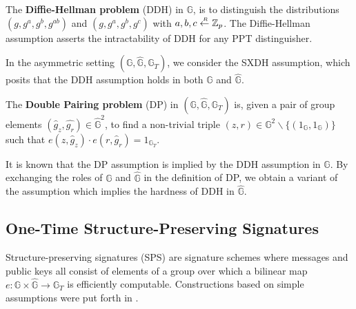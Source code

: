 \documentclass[10pt]{llncs}
\newcommand{\G}{\mathbb{G}}
\newcommand{\Z}{\mathbb{Z}}
\newcommand{\sample}{\stackrel{{\scriptscriptstyle \mkern4mu R}}{\gets}}
\begin{document}
\begin{definition} \label{DDH-def} The {\bf Diffie-Hellman problem} (DDH) in $\G$,
 is to distinguish the distributions $(g, g^a, g^b, g^{ab})$ and $(g, g^a, g^b, g^c)$ with $a, b, c \sample \Z_p$.
 The Diffie-Hellman assumption asserts the intractability of DDH for any PPT distinguisher.

 In the asymmetric setting $(\G,\hat{\G}, \G_T)$, we consider the SXDH  assumption,
 which posits that the DDH assumption holds in both $\G$ and $\hat{\G}$.
\end{definition}

\begin{definition} \label{DP-def} The {\bf Double Pairing problem} (DP) in $(\G, \hat{\G}, \G_T)$ is,
  given a pair of group elements $(\hat{g}_z, \hat{g_r}) \in \hat{\G}^2$,
  to find a non-trivial triple $(z, r) \in \G^2\backslash \{(1_{\G}, 1_{\G})\}$ such that $e(z, \hat{g}_z) \cdot e(r, \hat{g}_r) = 1_{\G_T}$.
\end{definition}


It is known \cite{DBLP:journals/iacr/AbeHO10} that the DP assumption is   implied by the   DDH assumption in $\G$. By exchanging the roles of $\G$ and 
$\hat{\G}$ 
in the definition of DP, we obtain a variant of the assumption which implies the hardness of DDH in $\hat{\G}$. 


\subsection{One-Time Structure-Preserving Signatures}\label{ot-sig}    

Structure-preserving signatures (SPS) \cite{DBLP:conf/crypto/AbeFGHO10,DBLP:journals/iacr/AbeHO10} are signature
schemes where messages and public keys all consist of elements of a group
over which a bilinear map $e: \G \times \hat{\G} \to \G_T$ is
efficiently computable. Constructions based on simple assumptions were
put forth in \cite{DBLP:conf/asiacrypt/AbeCDKNO12,DBLP:conf/pkc/AbeDKNO13}. 
\end{document}
